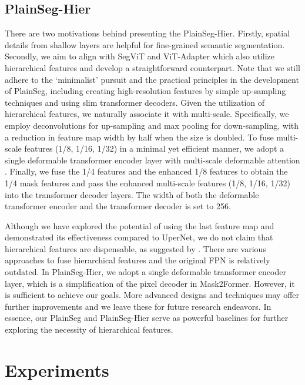 \documentclass{article} \usepackage{iclr2024_conference,times}
\begin{document}
\subsection{PlainSeg-Hier}
\label{PlainSeg-Hier}

There are two motivations behind presenting the PlainSeg-Hier. Firstly, spatial details from shallow layers are helpful for fine-grained semantic segmentation. Secondly, we aim to align with SegViT and ViT-Adapter which also utilize hierarchical features and develop a straightforward counterpart. Note that we still adhere to the `minimalist' pursuit and the practical principles in the development of PlainSeg, including creating high-resolution features by simple up-sampling techniques and using slim transformer decoders. Given the utilization of hierarchical features, we naturally associate it with multi-scale. Specifically, we employ deconvolutions for up-sampling and max pooling for down-sampling, with a reduction in feature map width by half when the size is doubled. To fuse multi-scale features (1/8, 1/16, 1/32) in a minimal yet efficient manner, we adopt a single deformable transformer encoder layer with multi-scale deformable attention \citep{zhu2021deformable}. Finally, we fuse the 1/4 features and the enhanced 1/8 features to obtain the 1/4 mask features and pass the enhanced multi-scale features (1/8, 1/16, 1/32) into the transformer decoder layers. The width of both the deformable transformer encoder and the transformer decoder is set to 256.

Although we have explored the potential of using the last feature map and demonstrated its effectiveness compared to UperNet, we do not claim that hierarchical features are dispensable, as suggested by \cite{li2022exploring}. There are various approaches to fuse hierarchical features and the original FPN \citep{lin2017feature} is relatively outdated. In PlainSeg-Hier, we adopt a single deformable transformer encoder layer, which is a simplification of the pixel decoder in Mask2Former. However, it is sufficient to achieve our goals. More advanced designs and techniques may offer further improvements and we leave these for future research endeavors. In essence, our PlainSeg and PlainSeg-Hier serve as powerful baselines for further exploring the necessity of hierarchical features.







\section{Experiments}
\end{document}
